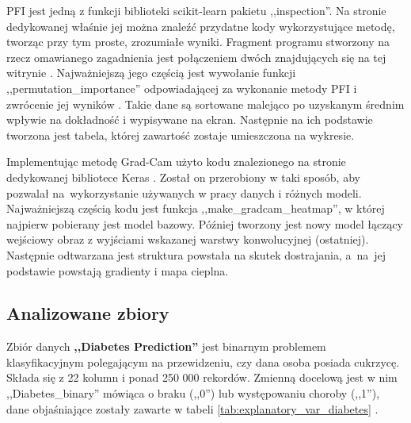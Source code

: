 PFI jest jedną z funkcji biblioteki scikit-learn pakietu ,,inspection''. Na stronie dedykowanej właśnie jej można znaleźć przydatne kody wykorzystujące metodę, tworząc przy tym proste, zrozumiałe wyniki. Fragment programu stworzony na rzecz omawianego zagadnienia jest połączeniem dwóch znajdujących się na tej witrynie \cite{pfi_documentation, pfi_example}. Najważniejszą jego częścią jest wywołanie funkcji ,,permutation\_importance'' odpowiadającej za wykonanie metody PFI i zwrócenie jej wyników \cite{permutation_importance_function}. Takie dane są sortowane malejąco po uzyskanym średnim wpływie na dokładność i wypisywane na ekran. Następnie na ich podstawie tworzona jest tabela, której zawartość zostaje umieszczona na wykresie.

Implementując metodę Grad-Cam użyto kodu znalezionego na stronie dedykowanej bibliotece Keras \cite{grad-cam_code}. Został on przerobiony w taki sposób, aby pozwalał na~wykorzystanie używanych w pracy danych i różnych modeli. Najważniejszą częścią kodu jest funkcja ,,make\_gradcam\_heatmap'', w której najpierw pobierany jest model bazowy. Później tworzony jest nowy model łączący wejściowy obraz z wyjściami wskazanej warstwy konwolucyjnej (ostatniej). Następnie odtwarzana jest struktura powstała na skutek dostrajania, a~na~jej podstawie powstają gradienty i mapa cieplna.

\subsection{Analizowane zbiory}
Zbiór danych \textbf{,,Diabetes Prediction''} jest binarnym problemem klasyfikacyjnym polegającym na przewidzeniu, czy dana osoba posiada cukrzycę. Składa się z 22 kolumn i ponad 250 000 rekordów. Zmienną docelową jest w nim ,,Diabetes\_binary'' mówiąca o braku (,,0'') lub występowaniu choroby (,,1''), dane objaśniające zostały zawarte w tabeli \ref{tab:explanatory_var_diabetes} \cite{diabetes_dataset}.   


